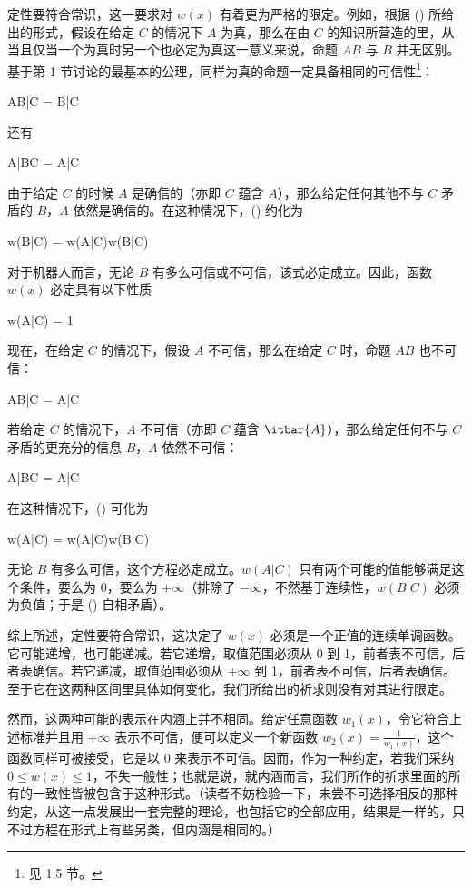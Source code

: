 定性要符合常识，这一要求对 $w(x)$ 有着更为严格的限定。例如，根据 () 所给出的形式，假设在给定 $C$ 的情况下 $A$ 为真，那么在由 $C$ 的知识所营造的里，从当且仅当一个为真时另一个也必定为真这一意义来说，命题 $AB$ 与 $B$ 并无区别。基于第 1 节讨论的最基本的公理，同样为真的命题一定具备相同的可信性\footnote{见 1.5 节。}：

\placeformula
\startformula
AB|C = B|C
\stopformula

还有

\placeformula
\startformula
A|BC = A|C
\stopformula

由于给定 $C$ 的时候 $A$ 是确信的（亦即 $C$ 蕴含 $A$），那么给定任何其他不与 $C$ 矛盾的 $B$，$A$ 依然是确信的。在这种情况下，() 约化为

\placeformula
\startformula
w(B|C) = w(A|C)w(B|C)
\stopformula

对于机器人而言，无论 $B$ 有多么可信或不可信，该式必定成立。因此，函数 $w(x)$ 必定具有以下性质

\placeformula
\startformula
w(A|C) = 1\;
\stopformula

现在，在给定 $C$ 的情况下，假设 $A$ 不可信，那么在给定 $C$ 时，命题 $AB$ 也不可信：

\placeformula
\startformula
AB|C = A|C
\stopformula

若给定 $C$ 的情况下，$A$ 不可信（亦即 $C$ 蕴含 $\itbar{A}$），那么给定任何不与 $C$ 矛盾的更充分的信息 $B$，$A$ 依然不可信：

\placeformula
\startformula
A|BC = A|C
\stopformula

在这种情况下，() 可化为

\placeformula[eq-zero]
\startformula
w(A|C) = w(A|C)w(B|C)
\stopformula

无论 $B$ 有多么可信，这个方程必定成立。$w(A|C)$ 只有两个可能的值能够满足这个条件，要么为 $0$，要么为 $+\infty$（排除了 $-\infty$，不然基于连续性，$w(B|C)$ 必须为负值；于是 (\in[eq-zero]) 自相矛盾）。

综上所述，定性要符合常识，这决定了 $w(x)$ 必须是一个正值的连续单调函数。它可能递增，也可能递减。若它递增，取值范围必须从 0 到 1，前者表不可信，后者表确信。若它递减，取值范围必须从 $+\infty$ 到 1，前者表不可信，后者表确信。至于它在这两种区间里具体如何变化，我们所给出的祈求则没有对其进行限定。

然而，这两种可能的表示在内涵上并不相同。给定任意函数 $w_1(x)$，令它符合上述标准并且用 $+\infty$ 表示不可信，便可以定义一个新函数 $\displaystyle w_2(x) = \frac{1}{w_1(x)}$，这个函数同样可被接受，它是以 0 来表示不可信。因而，作为一种约定，若我们采纳 $0\le w(x)\le 1$，不失一般性；也就是说，就内涵而言，我们所作的祈求里面的所有的一致性皆被包含于这种形式。（读者不妨检验一下，未尝不可选择相反的那种约定，从这一点发展出一套完整的理论，也包括它的全部应用，结果是一样的，只不过方程在形式上有些另类，但内涵是相同的。）

